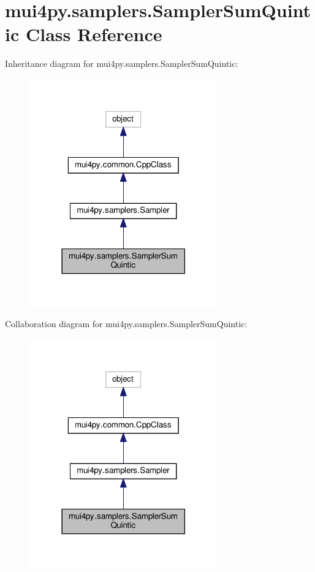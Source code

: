 \hypertarget{classmui4py_1_1samplers_1_1_sampler_sum_quintic}{}\section{mui4py.\+samplers.\+Sampler\+Sum\+Quintic Class Reference}
\label{classmui4py_1_1samplers_1_1_sampler_sum_quintic}


Inheritance diagram for mui4py.\+samplers.\+Sampler\+Sum\+Quintic\+:
\nopagebreak
\begin{figure}[H]
\begin{center}
\leavevmode
\includegraphics[width=230pt]{classmui4py_1_1samplers_1_1_sampler_sum_quintic__inherit__graph}
\end{center}
\end{figure}


Collaboration diagram for mui4py.\+samplers.\+Sampler\+Sum\+Quintic\+:
\nopagebreak
\begin{figure}[H]
\begin{center}
\leavevmode
\includegraphics[width=230pt]{classmui4py_1_1samplers_1_1_sampler_sum_quintic__coll__graph}
\end{center}
\end{figure}
